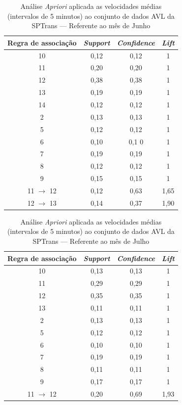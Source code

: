 \documentclass[
	12pt,				%
	oneside,			%
	a4paper,			%
	english,			%
	brazil				%
	]{abntex2ppgsi}
\begin{document}
{{\begin{apendicesenv}
\begin{table}[!htb]
\centering
\caption {Análise \textit{Apriori} aplicada as velocidades médias (intervalos de 5 minutos) ao conjunto de dados AVL da SPTrans --- Referente ao mês de Junho}
\label {tab:aprioriJune}
\begin{tabular}{c|c|c|c}
\toprule
\textbf{Regra de associação} & \textit{\textbf{Support}} & \textit{\textbf{Confidence}} & \textit{\textbf{Lift}} \\
\midrule
10 &  0,12 &  0,12 &  1\\
\hline
11 &  0,20 &  0,20 &  1\\
\hline
12 &  0,38 &  0,38 &  1\\
\hline
13 &  0,19 &  0,19 &  1\\
\hline
14 &  0,12 &  0,12 &  1\\
\hline
2 &  0,13 &  0,13 &  1\\
\hline
5 &  0,12 &  0,12 &  1\\
\hline
6 &  0,10 &  0,1 0&  1\\
\hline
7 &  0,19 &  0,19 &  1\\
\hline
8 &  0,12 &  0,12 &  1\\
\hline
9 &  0,15 &  0,15 &  1\\
\hline
11 $\rightarrow$ 12 &  0,12 &  0,63 &  1,65\\
\hline
12 $\rightarrow$ 13 &  0,14 &  0,37 &  1,90\\
\bottomrule
\end{tabular}
\end{table}

\begin{table}[!htb]
\centering
\caption {Análise \textit{Apriori} aplicada as velocidades médias (intervalos de 5 minutos) ao conjunto de dados AVL da SPTrans --- Referente ao mês de Julho}
\label {tab:aprioriJuly}
\begin{tabular}{c|c|c|c}
\toprule
\textbf{Regra de associação} & \textit{\textbf{Support}} & \textit{\textbf{Confidence}} & \textit{\textbf{Lift}} \\
\midrule
10 &  0,13 &  0,13 &  1\\
\hline
11 &  0,29 &  0,29 &  1\\
\hline
12 &  0,35 &  0,35 &  1\\
\hline
13 &  0,11 &  0,11 &  1\\
\hline
2 &  0,13 &  0,13 &  1\\
\hline
5 &  0,12 &  0,12 &  1\\
\hline
6 &  0,10 &  0,10 &  1\\
\hline
7 &  0,19 &  0,19 &  1\\
\hline
8 &  0,11 &  0,11 &  1\\
\hline
9 &  0,17 &  0,17 &  1\\
\hline
11 $\rightarrow$ 12 &  0,20 &  0,69 &  1,93\\
\bottomrule
\end{tabular}
\end{table}


\end{apendicesenv}}}
\end{document}
